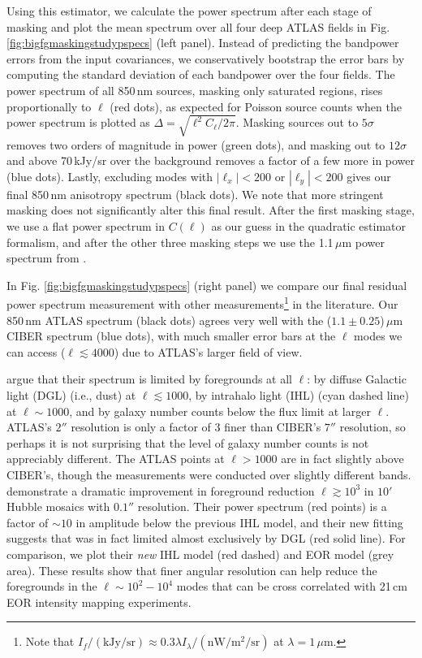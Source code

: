 \documentclass[numberedappendix]{emulateapj}
\begin{document}
Using this estimator, we calculate the power spectrum after each stage of masking and plot the mean spectrum over all four deep ATLAS fields in Fig. \ref{fig:bigfgmaskingstudypspecs} (left panel). Instead of predicting the bandpower errors from the input covariances, we conservatively bootstrap the error bars by computing the standard deviation
 of each bandpower over the four fields. The power spectrum of all 850\,nm sources, masking only saturated regions, rises proportionally to $\ell$ (red dots), as expected for Poisson source counts when the power spectrum is plotted as $\Delta=\sqrt{\ell^2C_\ell/2\pi}$. Masking sources out to $5\sigma$ removes two orders of magnitude in power (green dots), and masking out to $12\sigma$ and above 70\,kJy/sr over the background removes a factor of a few more in power (blue dots). Lastly, excluding modes with $|\ell_x|<200$ or $|\ell_y|<200$ gives our final 850\,nm anisotropy spectrum (black dots). We note that more stringent masking does not significantly alter this final result. After the first masking stage, we use a flat power spectrum in $C(\ell)$ as our guess in the quadratic estimator formalism, and after the other three masking steps we use the 1.1\,$\mu$m power spectrum from \citet{zemcov14}.

In Fig. \ref{fig:bigfgmaskingstudypspecs} (right panel) we compare our final residual power spectrum measurement with other measurements\footnote{Note that $I_f/(\text{kJy/sr})\approx0.3\lambda I_\lambda/(\text{nW}/\text{m}^2/\text{sr})$ at $\lambda=1$\,$\mu$m.} in the literature. Our 850\,nm ATLAS spectrum (black dots) agrees very well with the ($1.1\pm0.25$)\,$\mu$m CIBER spectrum \citep{zemcov14} (blue dots), with much smaller error bars at the $\ell$ modes we can access ($\ell\lesssim4000$) due to ATLAS's larger field of view. 

\citet{zemcov14} argue that their spectrum is limited by foregrounds at all $\ell$: by diffuse Galactic light (DGL) (i.e., dust) at $\ell\lesssim1000$, by intrahalo light (IHL) (cyan dashed line) at $\ell\sim1000$, and by galaxy number counts below the flux limit at larger $\ell$. ATLAS's $2''$ resolution is only a factor of 3 finer than CIBER's $7''$ resolution, so perhaps it is not surprising that the level of galaxy number counts is not appreciably different. The ATLAS points at $\ell>1000$ are in fact slightly above CIBER's, though the measurements were conducted over slightly different bands. \citet{mw15} demonstrate a dramatic improvement in foreground reduction $\ell\gtrsim10^3$ in $10'$ Hubble mosaics with $0.1''$ resolution. Their power spectrum (red points) is a factor of $\sim10$ in amplitude below the previous IHL model, and their new fitting suggests that \citet{zemcov14} was in fact limited almost exclusively by DGL (red solid line). For comparison, we plot their \textit{new} IHL model (red dashed) and EOR model (grey area). These results show that finer angular resolution can help reduce the foregrounds in the $\ell\sim10^2-10^4$ modes that can be cross correlated with 21\,cm EOR intensity mapping experiments. 
\end{document}
